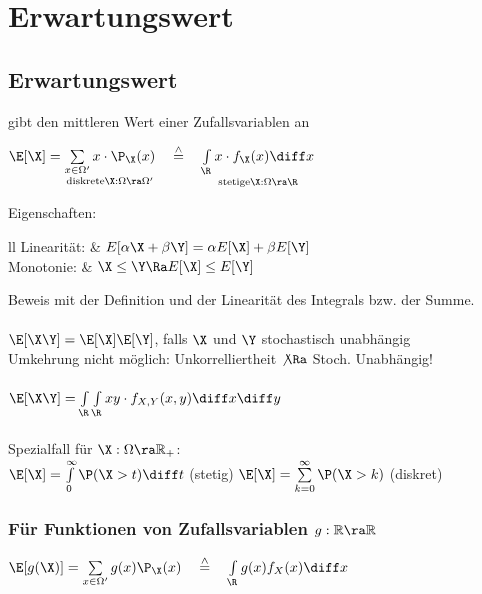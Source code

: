 \documentclass[german,color,6pt]{latex4ei/latex4ei_sheet}
\begin{document}
\columnbreak
\section{Erwartungswert}
\begin{sectionbox}
	\subsection{Erwartungswert}
	gibt den mittleren Wert einer Zufallsvariablen an

	\begin{emphbox}
		$\E [\X] = \underset{\text{diskrete} \X:\Omega \ra \Omega'}{\sum\limits_{x \in \Omega'} x \cdot \P_{\X}(x)} \quad \stackrel{\wedge}{=}\quad \underset{\text{stetige} \X: \Omega \ra \R}{\int \limits_{\R} x \cdot f_{\X} (x) \diff x}$
	\end{emphbox}
	Eigenschaften:
	\begin{tablebox}{ll}	
		Linearität: &
		$E[\alpha \X + \beta \Y] = \alpha E [\X] + \beta E[\Y]$ \\ 
		Monotonie: & 
		$\X \le \Y \Ra E[\X] \le E[\Y]$ \\
	\end{tablebox}
	Beweis mit der Definition und der Linearität des Integrals bzw. der Summe. \\ 
	\\
	$\E[\X\Y] = \E[\X] \E[\Y]$, falls $\X$ und $\Y$ stochastisch unabhängig\\
	Umkehrung nicht möglich: Unkorrelliertheit $\not \Ra$ Stoch. Unabhängig! \\
	\\
	$\E[\X\Y]= \int \limits_{\R}\int \limits_{\R}  xy \cdot f_{X,Y} (x,y) \diff x \diff y$\\
	\\
	Spezialfall für $\X: \Omega \ra \mathbb R_+$: \\
	$\E[\X] = \int \limits_0^\infty \P(\X > t) \diff t$ (stetig) \qquad $\E[\X] = \sum \limits_{k=0}^{\infty} \P(\X >k)$ (diskret)

	\subsubsection{Für Funktionen von Zufallsvariablen $g: \mathbb R \ra \mathbb R$}
	$\E[g(\X)] = \sum \limits_{x \in \Omega'} g(x) \P_{\X} (x)\quad \stackrel{\wedge}{=}\quad \int \limits_{\R} g(x) f_X (x) \diff x$
\end{sectionbox}
\end{document}
